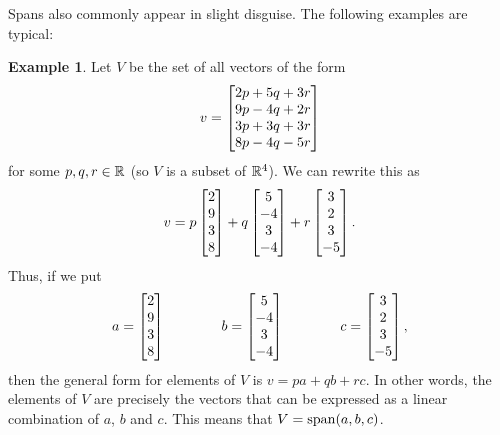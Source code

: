 \documentclass[reqno]{amsart}
\theoremstyle{definition}
\newtheorem{example}[theorem]{Example}
\begin{document}
Spans also commonly appear in slight disguise.  The following examples
are typical:
\begin{example}\label{eg-span-form-i}
 Let $V$ be the set of all vectors of the form 
 \[ v = \left[\begin{matrix} 2p + 5q + 3r \\
             9p - 4q + 2r \\
             3p + 3q + 3r \\
             8p - 4q - 5r \end{matrix}\right]
 \]
 for some $p,q,r\in{\mathbb{R}}$ (so $V$ is a subset of ${\mathbb{R}}^4$).  We can rewrite
 this as  
 \[ v = p \left[\begin{matrix} 2 \\  9 \\  3 \\  8 \end{matrix}\right] + 
        q \left[\begin{matrix} 5 \\ -4 \\  3 \\ -4 \end{matrix}\right] + 
        r \left[\begin{matrix} 3 \\  2 \\  3 \\ -5 \end{matrix}\right].
 \]
 Thus, if we put 
 \[ a = \left[\begin{matrix} 2 \\  9 \\  3 \\  8 \end{matrix}\right] \hspace{4em}
    b = \left[\begin{matrix} 5 \\ -4 \\  3 \\ -4 \end{matrix}\right] \hspace{4em}
    c = \left[\begin{matrix} 3 \\  2 \\  3 \\ -5 \end{matrix}\right],
 \]
 then the general form for elements of $V$ is $v=pa+qb+rc$.  In other
 words, the elements of $V$ are precisely the vectors that can be
 expressed as a linear combination of $a$, $b$ and $c$.  This means
 that $V=\operatorname{span}(a,b,c)$.
\end{example}
\end{document}

